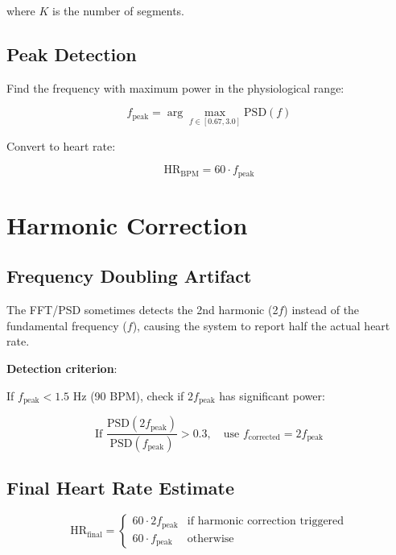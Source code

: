 \documentclass[11pt,a4paper]{article}
\begin{document}
where $K$ is the number of segments.

\subsection{Peak Detection}

Find the frequency with maximum power in the physiological range:

\begin{equation}
f_{\text{peak}} = \arg\max_{f \in [0.67, 3.0]} \text{PSD}(f)
\end{equation}

Convert to heart rate:

\begin{equation}
\text{HR}_{\text{BPM}} = 60 \cdot f_{\text{peak}}
\end{equation}

\section{Harmonic Correction}

\subsection{Frequency Doubling Artifact}

The FFT/PSD sometimes detects the 2nd harmonic (2$f$) instead of the fundamental frequency ($f$), causing the system to report half the actual heart rate.

\textbf{Detection criterion}:

If $f_{\text{peak}} < 1.5$ Hz (90 BPM), check if $2f_{\text{peak}}$ has significant power:

\begin{equation}
\text{If } \frac{\text{PSD}(2f_{\text{peak}})}{\text{PSD}(f_{\text{peak}})} > 0.3, \quad \text{use } f_{\text{corrected}} = 2f_{\text{peak}}
\end{equation}

\subsection{Final Heart Rate Estimate}

\begin{equation}
\text{HR}_{\text{final}} = \begin{cases}
60 \cdot 2f_{\text{peak}} & \text{if harmonic correction triggered} \\
60 \cdot f_{\text{peak}} & \text{otherwise}
\end{cases}
\end{equation}
\end{document}
